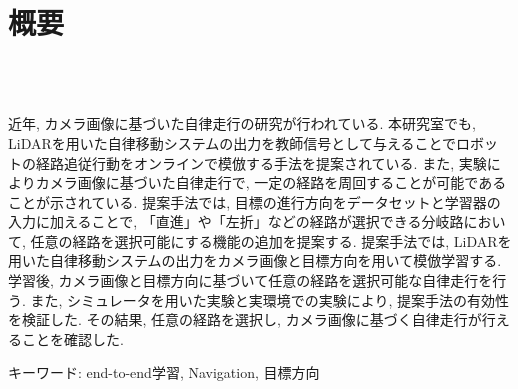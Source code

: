 \chapter*{概要}
\thispagestyle{empty}
%
\begin{center}
  \scalebox{1.5}{視覚と行動のend-to-end学習により}\\
  \scalebox{1.5}{経路追従行動をオンラインで模倣する手法の提案}\\
  \scalebox{1.5}{（目標方向による経路選択機能の追加と検証）}
\end{center}
\vspace{1.0zh}
%
近年, カメラ画像に基づいた自律走行の研究が行われている. 本研究室でも, LiDARを用いた自律移動システムの出力を教師信号として与えることでロボットの経路追従行動をオンラインで模倣する手法を提案されている. また, 実験によりカメラ画像に基づいた自律走行で, 一定の経路を周回することが可能であることが示されている. 提案手法では, 目標の進行方向をデータセットと学習器の入力に加えることで, 「直進」や「左折」などの経路が選択できる分岐路において, 任意の経路を選択可能にする機能の追加を提案する. 提案手法では, LiDARを用いた自律移動システムの出力をカメラ画像と目標方向を用いて模倣学習する. 学習後, カメラ画像と目標方向に基づいて任意の経路を選択可能な自律走行を行う. また, シミュレータを用いた実験と実環境での実験により, 提案手法の有効性を検証した. その結果, 任意の経路を選択し, カメラ画像に基づく自律走行が行えることを確認した.

キーワード: end-to-end学習, Navigation, 目標方向
%
\newpage
